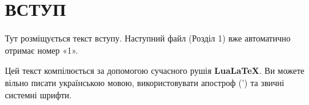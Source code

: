 
\setcounter{secnumdepth}{-1} %
\chapter{ВСТУП}             %
\setcounter{secnumdepth}{2}  %

Тут розміщується текст вступу. Наступний файл (Розділ 1) вже автоматично отримає номер «1».

Цей текст компілюється за допомогою сучасного рушія \textbf{LuaLaTeX}. Ви можете вільно писати українською мовою, використовувати апостроф (’) та звичні системні шрифти. 

	